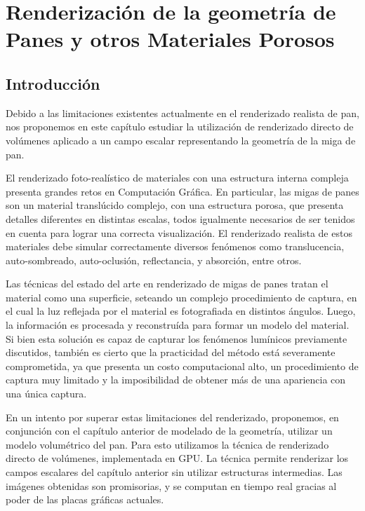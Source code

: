 
\chapter[Renderización de la geometría de Panes]{Renderización de la geometría de Panes y otros Materiales Porosos}
\section{Introducción}
Debido a las limitaciones existentes actualmente en el renderizado realista de pan, nos proponemos en este capítulo estudiar la utilización de renderizado directo de volúmenes aplicado a un campo escalar representando la geometría de la miga de pan. 

El renderizado foto-realístico de materiales con una estructura interna compleja presenta grandes retos en Computación Gráfica.
En particular, las migas de panes son un material translúcido complejo, con una estructura porosa, que presenta detalles diferentes en distintas escalas, todos igualmente necesarios de ser tenidos en cuenta para lograr una correcta visualización.
El renderizado realista de estos materiales debe simular correctamente diversos fenómenos como translucencia, auto-sombreado, auto-oclusión, reflectancia, y absorción, entre otros.

Las técnicas del estado del arte en renderizado de migas de panes tratan el material como una superficie, seteando un complejo procedimiento de captura, en el cual la luz reflejada por el material es fotografiada en distintos ángulos.
Luego, la información es procesada y reconstruída para formar un modelo del material.
Si bien esta solución es capaz de capturar los fenómenos lumínicos previamente discutidos, también es cierto que la practicidad del método está severamente comprometida, ya que presenta un costo computacional alto, un procedimiento de captura muy limitado y la imposibilidad de obtener más de una apariencia con una única captura.

En un intento por superar estas limitaciones del renderizado, proponemos, en conjunción con el capítulo anterior de modelado de la geometría, utilizar un modelo volumétrico del pan.
Para esto utilizamos la técnica de renderizado directo de volúmenes, implementada en GPU.
La técnica permite renderizar los campos escalares del capítulo anterior sin utilizar estructuras intermedias.
Las imágenes obtenidas son promisorias, y se computan en tiempo real gracias al poder de las placas gráficas actuales.

